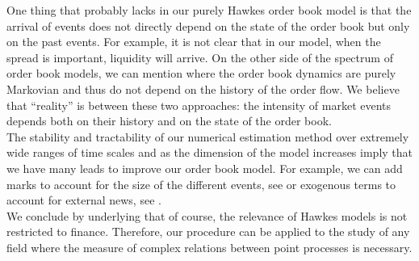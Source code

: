 \documentclass[a4paper,11pt]{article}
\begin{document}
\noindent One thing that probably lacks in our purely Hawkes order book model is that the arrival of events does not directly depend on the state of the order book but only on the past events. For example, it is not clear that in our model, when the spread is important, liquidity will arrive. On the other side of the spectrum of order book models, we can mention \cite{gareche2013fokker,huang2013simulating} where the order book dynamics are purely Markovian and thus do not depend on the history of the order flow. We believe that ``reality'' is between these two approaches: the intensity of market events depends both on their history and on the state of the order book.\\






\noindent The stability and tractability of our numerical estimation method over extremely wide ranges of time scales and as the dimension of the model increases imply that we have many leads to improve our order book model. For example, we can add marks to account for the size of the different events, see \cite{bacry2014second} or exogenous terms to account for external news, see \cite{rambaldi2014modeling}.\\

\noindent We conclude by underlying that of course, the relevance of Hawkes models is not restricted to finance. Therefore, our procedure can be applied to the study of any field where the measure of complex relations between point processes is necessary.


\end{document}
